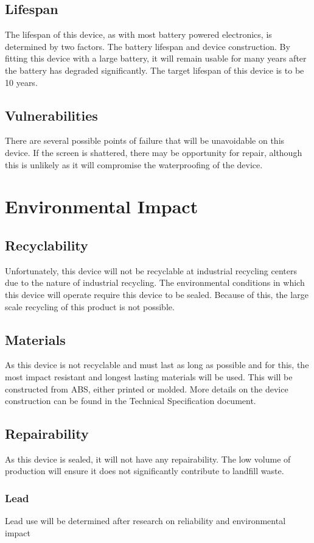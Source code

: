 \documentclass{article}
\begin{document}
\subsection{Lifespan}
The lifespan of this device, as with most battery powered electronics, is determined by two factors. The battery lifespan and device construction. By fitting this device with a large battery, it will remain usable for many years after the battery has degraded significantly. The target lifespan of this device is to be 10 years.

\subsection{Vulnerabilities}
There are several possible points of failure that will be unavoidable on this device. If the screen is shattered, there may be opportunity for repair, although this is unlikely as it will compromise the waterproofing of the device. 

\section{Environmental Impact} %

\subsection{Recyclability}
Unfortunately, this device will not be recyclable at industrial recycling centers due to the nature of industrial recycling. The environmental conditions in which this device will operate require this device to be sealed. Because of this, the large scale recycling of this product is not possible. 

\subsection{Materials}
As this device is not recyclable and must last as long as possible and for this, the most impact resistant and longest lasting materials will be used. This will be constructed from ABS, either printed or molded. More details on the device construction can be found in the Technical Specification document.

\subsection{Repairability}
As this device is sealed, it will not have any repairability. The low volume of production will ensure it does not significantly contribute to landfill waste.

\subsubsection*{Lead}
Lead use will be determined after research on reliability and environmental impact
\end{document}
